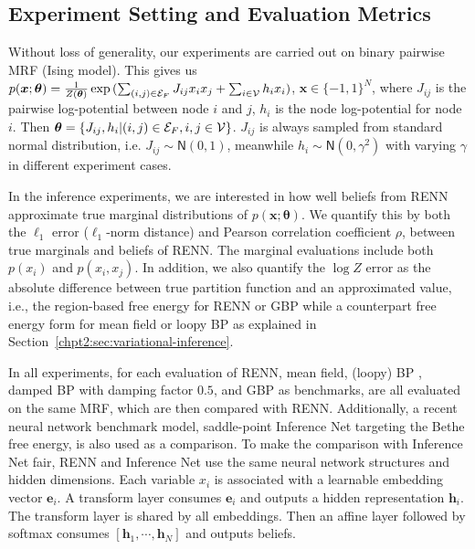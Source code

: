 \subsection{Experiment Setting and Evaluation Metrics}
\label{subsec:exp-setting}
Without loss of generality, our experiments are carried out on binary pairwise MRF (Ising model). This gives us $p(\bm{x}; \bm{\theta}) = \frac{1}{Z(\bm{\theta})}\exp{(\sum_{(i,j)\in \mathcal{E}_F} J_{ij} x_i x_j + \sum_{i\in \mathcal{V}}h_i x_i)}$, $\bm{x} \in \{-1, 1\}^{N}$, where $J_{ij}$ is the pairwise log-potential between node $i$ and $j$, $h_i$ is the node log-potential for node $i$. Then $\bm{\theta} = \left\{ J_{ij}, h_i| (i,j) \in \mathcal{E}_F, i,j \in \mathcal{V} \right\}$. $J_{ij}$ is always sampled from standard normal distribution, i.e. $J_{ij}\sim \mathsf{N}(0,1)$, meanwhile $h_i \sim \mathsf{N}(0, \gamma^{2})$ with varying $\gamma$ in different experiment cases.

In the inference experiments, we are interested in how well beliefs from RENN approximate true marginal distributions of $p(\bm{x};\bm{\theta})$. We quantify this by both the $\ell_1$ error ($\ell_1$-norm distance) and Pearson correlation coefficient $\rho$, between true marginals and beliefs of RENN. The marginal evaluations include both $p(x_i)$ and $p(x_i,x_j)$. In addition, we also quantify the $\log{Z}$ error as the absolute difference between true partition function and an approximated value, i.e., the region-based free energy for RENN or GBP while a counterpart free energy form for mean field or loopy BP as explained in Section~\ref{chpt2:sec:variational-inference}.

In all experiments, for each evaluation of RENN, mean field, (loopy) BP \cite{mooij2007sufficient}, damped BP \cite{Pretti2005damping} with damping factor $0.5$, and GBP \cite{yedida2005constucting} as benchmarks, are all evaluated on the same MRF, which are then compared with RENN. Additionally, a recent neural network benchmark model, saddle-point Inference Net \cite{NIPS2019_9687} targeting the Bethe free energy, is also used as a comparison. To make the comparison with Inference Net fair, RENN and Inference Net use the same neural network structures and hidden dimensions. Each variable $x_i$ is associated with a learnable embedding vector $\bm{e}_i$. A transform layer \cite{AshishNIPS2017_7181} consumes $\bm{e}_i$ and outputs a hidden representation $\bm{h}_i$. The transform layer is shared by all embeddings. Then an affine layer followed by softmax consumes $[\bm{h}_1, \cdots, \bm{h}_N]$ and outputs beliefs.

